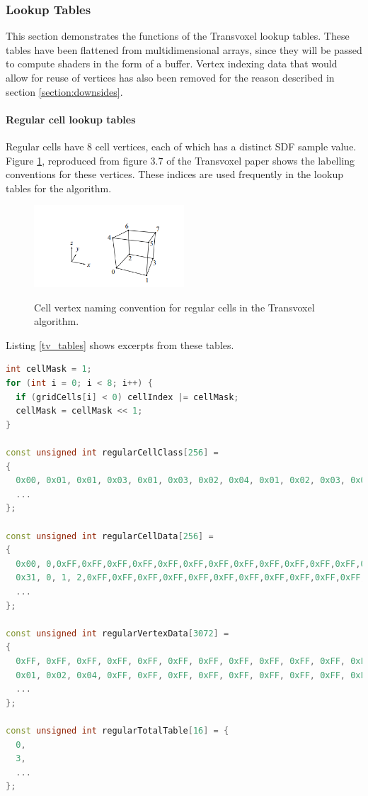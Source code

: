 \documentclass[11pt]{article}
\begin{document}
\subsubsection{Lookup Tables}
\label{section:lookup_tables}

This section demonstrates the functions of the Transvoxel lookup tables. These tables have been flattened from multidimensional arrays, since they will be passed to compute shaders in the form of a buffer. Vertex indexing data that would allow for reuse of vertices has also been removed for the reason described in section \ref{section:downsides}.

\paragraph{Regular cell lookup tables}
Regular cells have 8 cell vertices, each of which has a distinct SDF sample value. Figure \ref{fig:tv_labels}, reproduced from figure 3.7 of the Transvoxel paper\cite{lengyel_2010} shows the labelling conventions for these vertices. These indices are used frequently in the lookup tables for the algorithm.

\begin{figure}
  \caption{Cell vertex naming convention for regular cells in the Transvoxel algorithm.}
  \includegraphics[width=0.5\textwidth]{tv_labels.PNG}
  \label{fig:tv_labels}
\end{figure}
Listing \ref{tv_tables} shows excerpts from these tables.

\begin{lstlisting}[language=C++,label={tv_tables},caption={Calculation of \texttt{cellIndex}, and lookup tables for regular cells in the Transvoxel algorithm. An example of their usage is given below.}]
int cellMask = 1;
for (int i = 0; i < 8; i++) {
  if (gridCells[i] < 0) cellIndex |= cellMask;
  cellMask = cellMask << 1;
}

const unsigned int regularCellClass[256] =
{
  0x00, 0x01, 0x01, 0x03, 0x01, 0x03, 0x02, 0x04, 0x01, 0x02, 0x03, 0x04, 0x03, 0x04, 0x04, 0x03,
  ...
};

const unsigned int regularCellData[256] =
{
  0x00, 0,0xFF,0xFF,0xFF,0xFF,0xFF,0xFF,0xFF,0xFF,0xFF,0xFF,0xFF,0xFF,0xFF,0xFF,
  0x31, 0, 1, 2,0xFF,0xFF,0xFF,0xFF,0xFF,0xFF,0xFF,0xFF,0xFF,0xFF,0xFF,0xFF,
  ...
};

const unsigned int regularVertexData[3072] =
{
  0xFF, 0xFF, 0xFF, 0xFF, 0xFF, 0xFF, 0xFF, 0xFF, 0xFF, 0xFF, 0xFF, 0xFF,
  0x01, 0x02, 0x04, 0xFF, 0xFF, 0xFF, 0xFF, 0xFF, 0xFF, 0xFF, 0xFF, 0xFF,
  ...
};

const unsigned int regularTotalTable[16] = {
  0,
  3,
  ...
};
\end{lstlisting}
\end{document}
